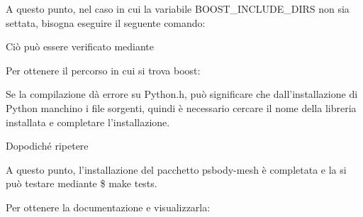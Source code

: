 \medskip
A questo punto, nel caso in cui la variabile BOOST\_INCLUDE\_DIRS non sia settata, 
bisogna eseguire il seguente comando: 





\medskip

Ciò può essere verificato mediante 

\medskip






\medskip\medskip\medskip

Per ottenere il percorso in cui si trova boost:







\medskip

Se la compilazione dà errore su Python.h, può significare che dall’installazione di Python manchino i file sorgenti, quindi è necessario cercare il nome della libreria installata e completare l’installazione.

\medskip





Dopodiché ripetere

\medskip






\medskip

A questo punto, l’installazione del pacchetto psbody-mesh è completata e la si può testare mediante \$ make tests.

\medskip

Per ottenere la documentazione e visualizzarla:





